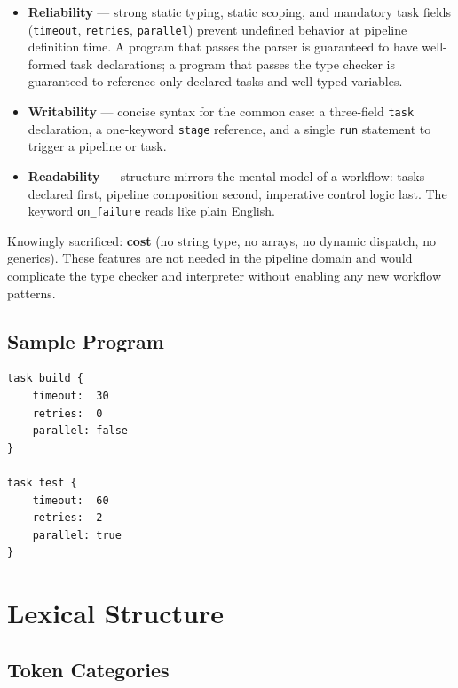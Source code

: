 \documentclass[10pt,a4paper]{article}
\begin{document}
\begin{itemize}
    \item \textbf{Reliability} --- strong static typing, static scoping,
          and mandatory task fields (\texttt{timeout}, \texttt{retries},
          \texttt{parallel}) prevent undefined behavior at pipeline
          definition time. A program that passes the parser is guaranteed
          to have well-formed task declarations; a program that passes the
          type checker is guaranteed to reference only declared tasks and
          well-typed variables.

    \item \textbf{Writability} --- concise syntax for the common case:
          a three-field \texttt{task} declaration, a one-keyword
          \texttt{stage} reference, and a single \texttt{run} statement
          to trigger a pipeline or task.

    \item \textbf{Readability} --- structure mirrors the mental model of
          a workflow: tasks declared first, pipeline composition second,
          imperative control logic last. The keyword
          \texttt{on\_failure} reads like plain English.
\end{itemize}

Knowingly sacrificed: \textbf{cost} (no string type, no arrays, no
dynamic dispatch, no generics). These features are not needed in the
pipeline domain and would complicate the type checker and interpreter
without enabling any new workflow patterns.

\subsection{Sample Program}

\begin{lstlisting}[caption={Sample WorkflowScript program}]
task build {
    timeout:  30
    retries:  0
    parallel: false
}

task test {
    timeout:  60
    retries:  2
    parallel: true
}
\end{lstlisting}

\section{Lexical Structure}

\subsection{Token Categories}
\end{document}
